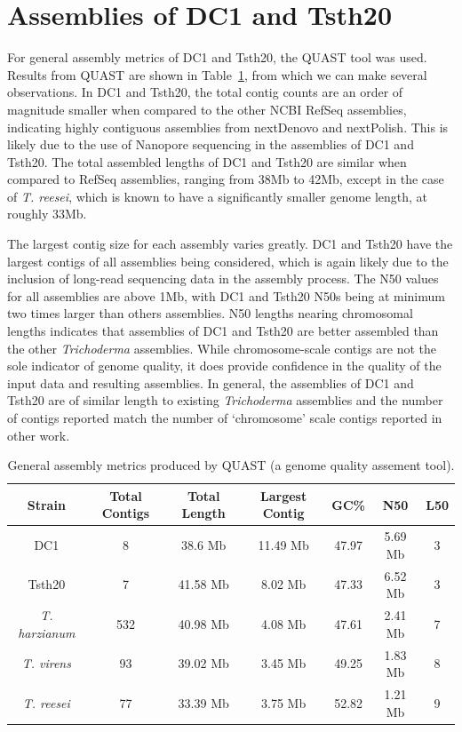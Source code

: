 \section{Assemblies of DC1 and Tsth20}
\label{section:assemblies}

For general assembly metrics of DC1 and Tsth20, the
QUAST\cite{Gurevich2013} tool was used. Results from QUAST are shown
in Table~\ref{table:assemblies}, from which we can make several
observations. In DC1 and Tsth20, the total contig counts are an order
of magnitude smaller when compared to the other NCBI RefSeq
assemblies, indicating highly contiguous assemblies from
nextDenovo\cite{Hu2024} and nextPolish\cite{Hu2020}. This is likely
due to the use of Nanopore sequencing in the assemblies of DC1 and
Tsth20. The total assembled lengths of DC1 and Tsth20 are similar when
compared to RefSeq assemblies, ranging from 38Mb to 42Mb, except in
the case of \textit{T. reesei}, which is known to have a significantly
smaller genome length\cite{Kubicek2019}, at roughly 33Mb.

The largest contig size for each assembly varies greatly. DC1 and
Tsth20 have the largest contigs of all assemblies being considered,
which is again likely due to the inclusion of long-read sequencing
data in the assembly process. The N50 values for all assemblies are
above 1Mb, with DC1 and Tsth20 N50s being at minimum two times larger
than others assemblies. N50 lengths nearing chromosomal lengths
indicates that assemblies of DC1 and Tsth20 are better assembled than
the other \textit{Trichoderma} assemblies. While chromosome-scale
contigs are not the sole indicator of genome quality, it does provide
confidence in the quality of the input data and resulting
assemblies. In general, the assemblies of DC1 and Tsth20 are of
similar length to existing \textit{Trichoderma} assemblies and the
number of contigs reported match the number of `chromosome' scale
contigs reported in other work\cite{Kubicek2019}.

\begin{table}
  \begin{center}
    \begin{tabular}{|c|c|c|c|c|c|c|}
      \hline
      Strain & Total Contigs & Total Length & Largest Contig & GC\% & N50 & L50 \\ \hline
      DC1 & 8 & 38.6 Mb & 11.49 Mb & 47.97 & 5.69 Mb & 3 \\ \hline
      Tsth20 & 7 & 41.58 Mb & 8.02 Mb & 47.33 & 6.52 Mb & 3 \\ \hline
      \textit{T. harzianum} & 532 & 40.98 Mb & 4.08 Mb & 47.61 & 2.41 Mb & 7 \\ \hline
      \textit{T. virens} & 93 & 39.02 Mb & 3.45 Mb & 49.25 & 1.83 Mb & 8 \\ \hline
      \textit{T. reesei} & 77 & 33.39 Mb & 3.75 Mb & 52.82 & 1.21 Mb & 9 \\ \hline
    \end{tabular}
  \end{center}
  \caption{General assembly metrics produced by
    QUAST\cite{Gurevich2013} (a genome quality assement tool).}
  \label{table:assemblies}
\end{table}

